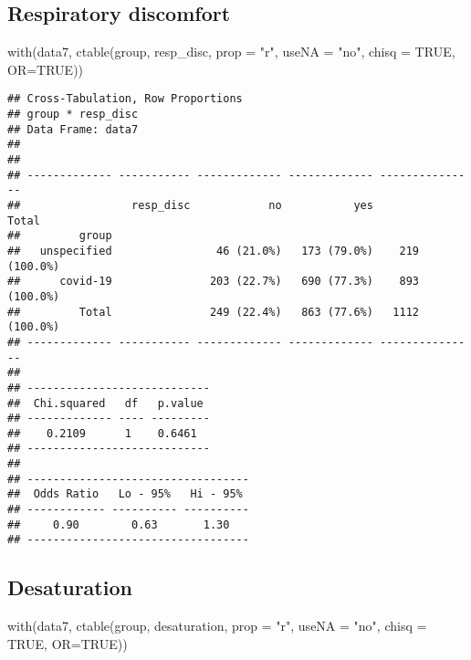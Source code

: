\documentclass[
]{article}
\newenvironment{Shaded}{\begin{snugshade}}{\end{snugshade}}
\newcommand{\AttributeTok}[1]{\textcolor[rgb]{0.77,0.63,0.00}{#1}}
\newcommand{\ConstantTok}[1]{\textcolor[rgb]{0.00,0.00,0.00}{#1}}
\newcommand{\FunctionTok}[1]{\textcolor[rgb]{0.00,0.00,0.00}{#1}}
\newcommand{\NormalTok}[1]{#1}
\newcommand{\StringTok}[1]{\textcolor[rgb]{0.31,0.60,0.02}{#1}}
\begin{document}
\hypertarget{respiratory-discomfort}{%
\subsection{Respiratory discomfort}\label{respiratory-discomfort}}

\begin{Shaded}
\begin{Highlighting}[]
\FunctionTok{with}\NormalTok{(data7, }\FunctionTok{ctable}\NormalTok{(group, resp\_disc, }\AttributeTok{prop =} \StringTok{"r"}\NormalTok{, }\AttributeTok{useNA =} \StringTok{"no"}\NormalTok{, }\AttributeTok{chisq =} \ConstantTok{TRUE}\NormalTok{, }\AttributeTok{OR=}\ConstantTok{TRUE}\NormalTok{))}
\end{Highlighting}
\end{Shaded}

\begin{verbatim}
## Cross-Tabulation, Row Proportions  
## group * resp_disc  
## Data Frame: data7  
## 
## 
## ------------- ----------- ------------- ------------- ---------------
##                 resp_disc            no           yes           Total
##         group                                                        
##   unspecified                46 (21.0%)   173 (79.0%)    219 (100.0%)
##      covid-19               203 (22.7%)   690 (77.3%)    893 (100.0%)
##         Total               249 (22.4%)   863 (77.6%)   1112 (100.0%)
## ------------- ----------- ------------- ------------- ---------------
## 
## ----------------------------
##  Chi.squared   df   p.value 
## ------------- ---- ---------
##    0.2109      1    0.6461  
## ----------------------------
## 
## ----------------------------------
##  Odds Ratio   Lo - 95%   Hi - 95% 
## ------------ ---------- ----------
##     0.90        0.63       1.30   
## ----------------------------------
\end{verbatim}

\hypertarget{desaturation}{%
\subsection{Desaturation}\label{desaturation}}

\begin{Shaded}
\begin{Highlighting}[]
\FunctionTok{with}\NormalTok{(data7, }\FunctionTok{ctable}\NormalTok{(group, desaturation, }\AttributeTok{prop =} \StringTok{"r"}\NormalTok{, }\AttributeTok{useNA =} \StringTok{"no"}\NormalTok{, }\AttributeTok{chisq =} \ConstantTok{TRUE}\NormalTok{, }\AttributeTok{OR=}\ConstantTok{TRUE}\NormalTok{))}
\end{Highlighting}
\end{Shaded}
\end{document}
